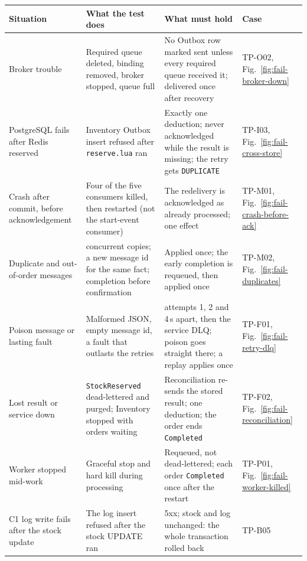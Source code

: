 \documentclass[a4paper]{report}
\begin{document}
\begin{table}[tbp]
\centering
\footnotesize
\renewcommand{\arraystretch}{1.15}
\begin{tabular}{@{}>{\raggedright\arraybackslash}p{}>{\raggedright\arraybackslash}p{}>{\raggedright\arraybackslash}p{}>{\raggedright\arraybackslash}p{}@{}}
\toprule
Situation & What the test does & What must hold & Case \\
\midrule
Broker trouble & Required queue deleted, binding removed, broker stopped, queue full & No Outbox row marked sent unless every required queue received it; delivered once after recovery & TP-O02, Fig.~\ref{fig:fail-broker-down} \\
PostgreSQL fails after Redis reserved & Inventory Outbox insert refused after \texttt{reserve.lua} ran & Exactly one deduction; never acknowledged while the result is missing; the retry gets \texttt{DUPLICATE} & TP-I03, Fig.~\ref{fig:fail-cross-store} \\
Crash after commit, before acknowledgement & Four of the five consumers killed, then restarted (not the start-event consumer) & The redelivery is acknowledged as already processed; one effect & TP-M01, Fig.~\ref{fig:fail-crash-before-ack} \\
Duplicate and out-of-order messages & 8 concurrent copies; a new message id for the same fact; completion before confirmation & Applied once; the early completion is requeued, then applied once & TP-M02, Fig.~\ref{fig:fail-duplicates} \\
Poison message or lasting fault & Malformed JSON, empty message id, a fault that outlasts the retries & 4 attempts 1, 2 and 4\,s apart, then the service DLQ; poison goes straight there; a replay applies once & TP-F01, Fig.~\ref{fig:fail-retry-dlq} \\
Lost result or service down & \texttt{StockReserved} dead-lettered and purged; Inventory stopped with orders waiting & Reconciliation re-sends the stored result; one deduction; the order ends \texttt{Completed} & TP-F02, Fig.~\ref{fig:fail-reconciliation} \\
Worker stopped mid-work & Graceful stop and hard kill during processing & Requeued, not dead-lettered; each order \texttt{Completed} once after the restart & TP-P01, Fig.~\ref{fig:fail-worker-killed} \\
C1 log write fails after the stock update & The log insert refused after the stock UPDATE ran & 5xx; stock and log unchanged: the whole transaction rolled back & TP-B05 \\

\end{tabular}
\end{table}
\end{document}
